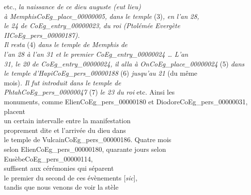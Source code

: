 \documentclass{book}
\begin{document}
{\begin{paracol}{2}
etc., \textit{la naissance de ce dieu auguste (eut lieu)\\
à Memphis\gls{CoEg_place_00000005}, dans le temple} (3)\textit{, en l’an 28,\\
le 24 de \gls{CoEg_entry_00000023}, du roi (Ptolémée Evergète II\gls{CoEg_pers_00000187}).\\
Il resta} (4) \textit{dans le temple de Memphis de\\
l’an 28 à l’an 31 et le premier \gls{CoEg_entry_00000024} … L’an\\
31, le 20 de \gls{CoEg_entry_00000024}, il alla à On\gls{CoEg_place_00000024}} (5) \textit{dans\\
le temple d’Hapi\gls{CoEg_pers_00000188}} (6) \textit{jusqu’au 21} (du même\\
mois)\textit{. Il fut introduit dans le temple de\\
Phtah\gls{CoEg_pers_00000047}} (7) \textit{le 23 du roi} etc. Ainsi les\\
monuments, comme Elien\gls{CoEg_pers_00000180} et Diodore\gls{CoEg_pers_00000031}, placent\\
un certain intervalle entre la manifestation\\
proprement dite et l’arrivée du dieu dans\\
le temple de Vulcain\gls{CoEg_pers_00000186}. Quatre mois\\
selon Elien\gls{CoEg_pers_00000180}, quarante jours selon Eusèbe\gls{CoEg_pers_00000114},\\
suffisent aux cérémonies qui séparent\\
le premier du second de ces évènements [\textit{sic}],\\
tandis que nous venons de voir la stèle
\end{paracol}

}
\end{document}
